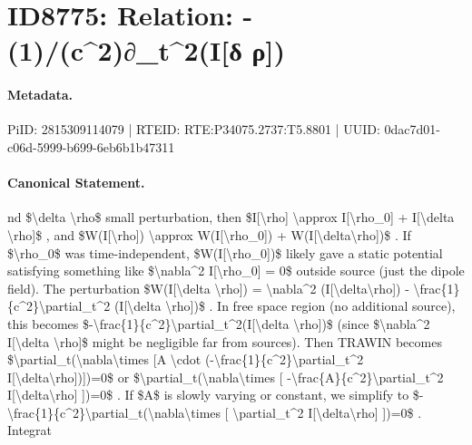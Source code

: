 \section*{ID8775: Relation: -(1)/(c\textasciicircum{}2)∂\_t\textasciicircum{}2(I[δ ρ])}
\paragraph{Metadata.}
PiID: 2815309114079 | RTEID: RTE:P34075.2737:T5.8801 | UUID: 0dac7d01-c06d-5999-b699-6eb6b1b47311

\paragraph{Canonical Statement.}
nd \$\textbackslash{}delta \textbackslash{}rho\$ small perturbation, then \$I[\textbackslash{}rho] \textbackslash{}approx I[\textbackslash{}rho\_0] + I[\textbackslash{}delta \textbackslash{}rho]\$ , and \$W(I[\textbackslash{}rho]) \textbackslash{}approx W(I[\textbackslash{}rho\_0]) + W(I[\textbackslash{}delta\textbackslash{}rho])\$ . If \$\textbackslash{}rho\_0\$ was time-independent, \$W(I[\textbackslash{}rho\_0])\$ likely gave a static potential satisfying something like \$\textbackslash{}nabla\textasciicircum{}2 I[\textbackslash{}rho\_0] = 0\$ outside source (just the dipole field). The perturbation \$W(I[\textbackslash{}delta \textbackslash{}rho]) = \textbackslash{}nabla\textasciicircum{}2 (I[\textbackslash{}delta\textbackslash{}rho]) - \textbackslash{}frac\{1\}\{c\textasciicircum{}2\}\textbackslash{}partial\_t\textasciicircum{}2 (I[\textbackslash{}delta \textbackslash{}rho])\$ . In free space region (no additional source), this becomes \$-\textbackslash{}frac\{1\}\{c\textasciicircum{}2\}\textbackslash{}partial\_t\textasciicircum{}2(I[\textbackslash{}delta \textbackslash{}rho])\$ (since \$\textbackslash{}nabla\textasciicircum{}2 I[\textbackslash{}delta \textbackslash{}rho]\$ might be negligible far from sources). Then TRAWIN becomes \$\textbackslash{}partial\_t(\textbackslash{}nabla\textbackslash{}times [A \textbackslash{}cdot (-\textbackslash{}frac\{1\}\{c\textasciicircum{}2\}\textbackslash{}partial\_t\textasciicircum{}2 I[\textbackslash{}delta\textbackslash{}rho])])=0\$ or \$\textbackslash{}partial\_t(\textbackslash{}nabla\textbackslash{}times [ -\textbackslash{}frac\{A\}\{c\textasciicircum{}2\}\textbackslash{}partial\_t\textasciicircum{}2 I[\textbackslash{}delta\textbackslash{}rho] ])=0\$ . If \$A\$ is slowly varying or constant, we simplify to \$-\textbackslash{}frac\{1\}\{c\textasciicircum{}2\}\textbackslash{}partial\_t(\textbackslash{}nabla\textbackslash{}times [ \textbackslash{}partial\_t\textasciicircum{}2 I[\textbackslash{}delta\textbackslash{}rho] ])=0\$ . Integrat

